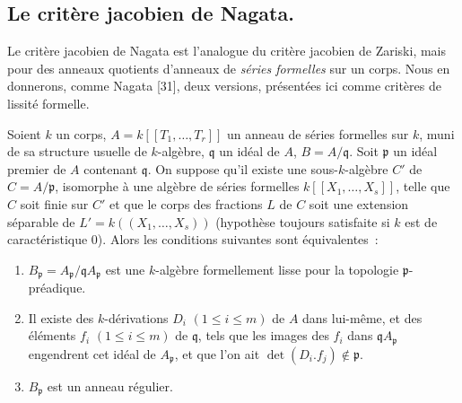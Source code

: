 \subsection{Le critère jacobien de Nagata.}
\label{subsection:0.22.7-fr}

\begin{env}[22.7.1]
\label{0.22.7.1-fr}
Le critère jacobien de Nagata est l'analogue du critère jacobien de Zariski,
mais pour des anneaux quotients d'anneaux de \emph{séries formelles} sur un
corps. Nous en donnerons, comme Nagata [31], deux versions, présentées ici
comme critères de lissité formelle.
\end{env}

\begin{proposition}[22.7.2]
\label{0.22.7.2-fr}
Soient $k$ un corps, $A=k[[T_1,\ldots,T_r]]$ un anneau de séries formelles sur
$k$, muni de sa structure usuelle de $k$-algèbre, $\mathfrak q$ un idéal de
$A$, $B=A/\mathfrak q$. Soit $\mathfrak p$ un idéal premier de $A$ contenant
$\mathfrak q$. On suppose qu'il existe une sous-$k$-algèbre $C'$ de
$C=A/\mathfrak p$, isomorphe à une algèbre de séries formelles
$k[[X_1,\ldots,X_s]]$, telle que $C$ soit finie sur $C'$ et que le corps des
fractions $L$ de $C$ soit une extension séparable de
$L'=k((X_1,\ldots,X_s))$ \textup{(hypothèse toujours satisfaite si $k$ est de
caractéristique 0)}. Alors les conditions suivantes sont équivalentes~:
\begin{enumerate}
  \item[\textup{a)}] $B_{\mathfrak p}=A_{\mathfrak p}/\mathfrak qA_{\mathfrak p}$ est
  une $k$-algèbre formellement lisse pour la topologie
  $\mathfrak p$-préadique.
  \item[\textup{b)}] Il existe des $k$-dérivations $D_i$ $(1\leq i\leq m)$ de $A$ dans
  lui-même, et des éléments $f_i$ $(1\leq i\leq m)$ de $\mathfrak q$, tels
  que les images des $f_i$ dans $\mathfrak qA_{\mathfrak p}$ engendrent cet
  idéal de $A_{\mathfrak p}$, et que l'on ait
  $\det(D_i.f_j)\notin\mathfrak p$.
  \item[\textup{c)}] $B_{\mathfrak p}$ est un anneau régulier.
\end{enumerate}
\end{proposition}

